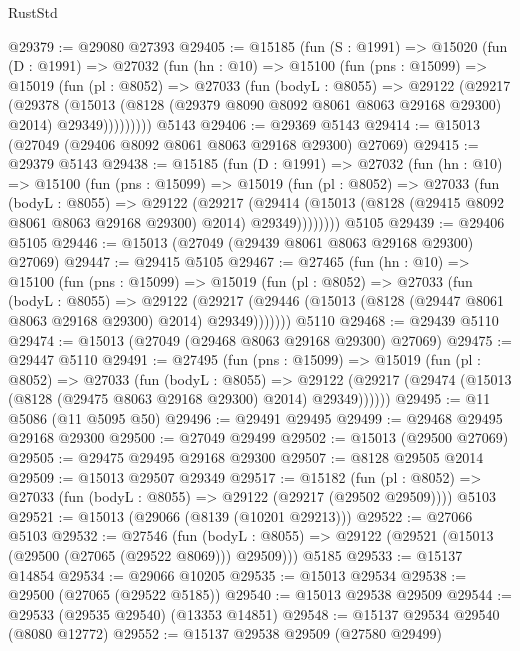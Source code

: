 \begin{lexlean}{RustStd}
\begin{coremodule}
@29379 := @29080 @27393
@29405 := @15185
    (fun (S : @1991) =>
    @15020
      (fun (D : @1991) =>
      @27032
        (fun (hn : @10) =>
        @15100
          (fun (pns : @15099) =>
          @15019
            (fun (pl : @8052) =>
            @27033
              (fun (bodyL : @8055) =>
              @29122
                (@29217
                  (@29378
                    (@15013
                      (@8128 (@29379 @8090 @8092 @8061 @8063 @29168 @29300) @2014)
                      @29349)))))))))
    @5143
@29406 := @29369 @5143
@29414 := @15013 (@27049 (@29406 @8092 @8061 @8063 @29168 @29300) @27069)
@29415 := @29379 @5143
@29438 := @15185
    (fun (D : @1991) =>
    @27032
      (fun (hn : @10) =>
      @15100
        (fun (pns : @15099) =>
        @15019
          (fun (pl : @8052) =>
          @27033
            (fun (bodyL : @8055) =>
            @29122
              (@29217
                (@29414
                  (@15013 (@8128 (@29415 @8092 @8061 @8063 @29168 @29300) @2014) @29349))))))))
    @5105
@29439 := @29406 @5105
@29446 := @15013 (@27049 (@29439 @8061 @8063 @29168 @29300) @27069)
@29447 := @29415 @5105
@29467 := @27465
    (fun (hn : @10) =>
    @15100
      (fun (pns : @15099) =>
      @15019
        (fun (pl : @8052) =>
        @27033
          (fun (bodyL : @8055) =>
          @29122
            (@29217 (@29446 (@15013 (@8128 (@29447 @8061 @8063 @29168 @29300) @2014) @29349)))))))
    @5110
@29468 := @29439 @5110
@29474 := @15013 (@27049 (@29468 @8063 @29168 @29300) @27069)
@29475 := @29447 @5110
@29491 := @27495
    (fun (pns : @15099) =>
    @15019
      (fun (pl : @8052) =>
      @27033
        (fun (bodyL : @8055) =>
        @29122 (@29217 (@29474 (@15013 (@8128 (@29475 @8063 @29168 @29300) @2014) @29349))))))
@29495 := @11 @5086 (@11 @5095 @50)
@29496 := @29491 @29495
@29499 := @29468 @29495 @29168 @29300
@29500 := @27049 @29499
@29502 := @15013 (@29500 @27069)
@29505 := @29475 @29495 @29168 @29300
@29507 := @8128 @29505 @2014
@29509 := @15013 @29507 @29349
@29517 := @15182
    (fun (pl : @8052) => @27033 (fun (bodyL : @8055) => @29122 (@29217 (@29502 @29509))))
    @5103
@29521 := @15013 (@29066 (@8139 (@10201 @29213)))
@29522 := @27066 @5103
@29532 := @27546
    (fun (bodyL : @8055) => @29122 (@29521 (@15013 (@29500 (@27065 (@29522 @8069))) @29509)))
    @5185
@29533 := @15137 @14854
@29534 := @29066 @10205
@29535 := @15013 @29534
@29538 := @29500 (@27065 (@29522 @5185))
@29540 := @15013 @29538 @29509
@29544 := @29533 (@29535 @29540) (@13353 @14851)
@29548 := @15137 @29534 @29540 (@8080 @12772)
@29552 := @15137 @29538 @29509 (@27580 @29499)

\end{coremodule}
\end{lexlean}
